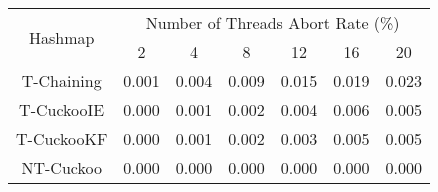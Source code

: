 \begin{tabular}{|c|c|c|c|c|c|c|}
\hline
\multirow{2}{*}{Hashmap} & \multicolumn{6}{c|}{Number of Threads Abort Rate (\%)}\\\cline{2-7}& 2 & 4 & 8 & 12 & 16 & 20\\
\hline
\hline
T-Chaining & 0.001 & 0.004 & 0.009 & 0.015 & 0.019 & 0.023\\
T-CuckooIE & 0.000 & 0.001 & 0.002 & 0.004 & 0.006 & 0.005\\
T-CuckooKF & 0.000 & 0.001 & 0.002 & 0.003 & 0.005 & 0.005\\
NT-Cuckoo & 0.000 & 0.000 & 0.000 & 0.000 & 0.000 & 0.000\\
\hline
\end{tabular}
